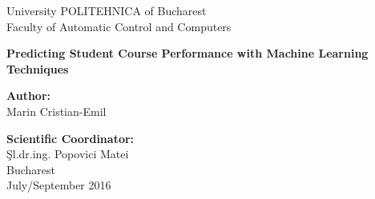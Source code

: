 \thispagestyle{empty}
\begin{center}
\large
University POLITEHNICA of Bucharest \\
Faculty of Automatic Control and Computers \\

{\LARGE
	\textbf{Predicting Student Course Performance with Machine Learning Techniques}
}

\vspace{3cm}
\textbf{Author:}\\
Marin Cristian-Emil

\bigskip
\bigskip

\textbf{Scientific Coordinator:}\\
Şl.dr.ing. Popovici Matei\\

Bucharest\\
July/September 2016 \\
\vspace*{1cm}
\end{center}
